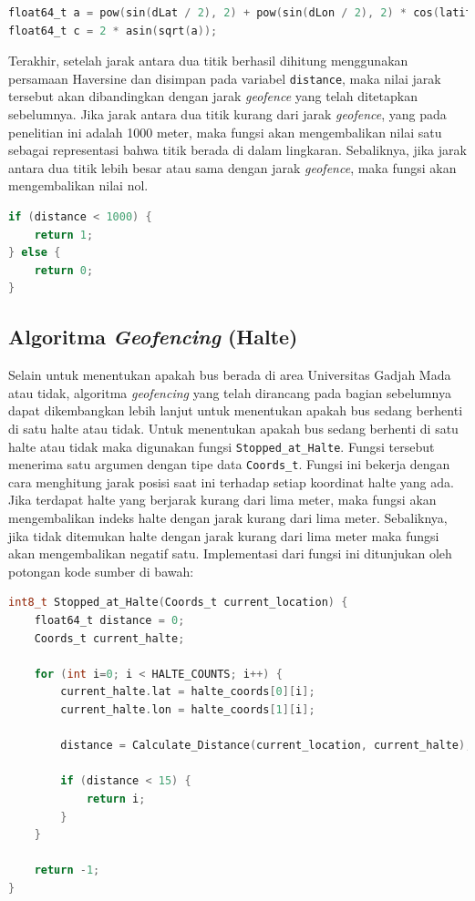 \begin{lstlisting}[language=c]
float64_t a = pow(sin(dLat / 2), 2) + pow(sin(dLon / 2), 2) * cos(latitude) * cos(longitude);
float64_t c = 2 * asin(sqrt(a));
\end{lstlisting}

Terakhir, setelah jarak antara dua titik berhasil dihitung menggunakan persamaan Haversine dan disimpan pada variabel \texttt{distance}, maka nilai jarak tersebut akan dibandingkan dengan jarak \textit{geofence} yang telah ditetapkan sebelumnya. Jika jarak antara dua titik kurang dari jarak \textit{geofence}, yang pada penelitian ini adalah 1000 meter, maka fungsi akan mengembalikan nilai satu sebagai representasi bahwa titik berada di dalam lingkaran. Sebaliknya, jika jarak antara dua titik lebih besar atau sama dengan jarak \textit{geofence}, maka fungsi akan mengembalikan nilai nol.

\begin{lstlisting}[language=c]
 if (distance < 1000) {
	return 1;
} else {
	return 0;
}
\end{lstlisting}

\iffalse
\subsection{Algoritma \textit{Geofencing} (Halte)}
Selain untuk menentukan apakah bus berada di area Universitas Gadjah Mada atau tidak, algoritma \textit{geofencing} yang telah dirancang pada bagian sebelumnya dapat dikembangkan lebih lanjut untuk menentukan apakah bus sedang berhenti di satu halte atau tidak. Untuk menentukan apakah bus sedang berhenti di satu halte atau tidak maka digunakan fungsi \texttt{Stopped\_at\_Halte}. Fungsi tersebut menerima satu argumen dengan tipe data \texttt{Coords\_t}. Fungsi ini bekerja dengan cara menghitung jarak posisi saat ini terhadap setiap koordinat halte yang ada. Jika terdapat halte yang berjarak kurang dari lima meter, maka fungsi akan mengembalikan indeks halte dengan jarak kurang dari lima meter. Sebaliknya, jika tidak ditemukan halte dengan jarak kurang dari lima meter maka fungsi akan mengembalikan negatif satu. Implementasi dari fungsi ini ditunjukan oleh potongan kode sumber di bawah:

\begin{lstlisting}[language=c]
int8_t Stopped_at_Halte(Coords_t current_location) {
	float64_t distance = 0;
	Coords_t current_halte;
	
	for (int i=0; i < HALTE_COUNTS; i++) {
		current_halte.lat = halte_coords[0][i];
		current_halte.lon = halte_coords[1][i];
		
		distance = Calculate_Distance(current_location, current_halte);
		
		if (distance < 15) {
			return i;
		}
	}
	
	return -1;
}
\end{lstlisting}

